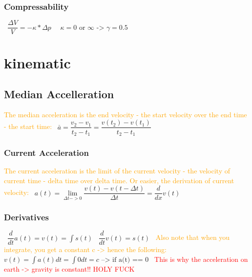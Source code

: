 \documentclass[main.tex,fontsize=8pt,paper=a4,paper=portrait,DIV=calc,]{scrartcl}
\begin{document}
\begin{multicols*}{2}
\subsubsection{Compressability}
\, \newline
\large \( \dfrac{\Delta V}{V} = - \kappa * \Delta p  \)
\, \newline
\, \newline
\large \( \kappa = 0 \text{ or } \infty \text{ -> } \gamma = 0.5  \)
\, \newline
\normalsize 

\section{kinematic}
\subsection{Median Accelleration}
\textcolor{orange}{The median acceleration is the end velocity - the start velocity over the end time - the start time:}\newline
\, \newline
\large \( \overset{\_}{a} = \dfrac{v_2 - v_1}{t_2 - t_1} = \dfrac{v(t_2) - v(t_1)}{t_2 - t_1} \) \newline
\normalsize 

\subsubsection{Current Acceleration}
\textcolor{orange}{The current acceleration is the limit of the current velocity - the velocity of current time - delta time over delta time. \newline
Or easier, the derivation of current velocity:}\newline
\, \newline
\large \( a(t) = \underset{\Delta t -> 0}{\lim} \dfrac{v(t) - v(t - \Delta t)}{\Delta t} = \dfrac{d}{dx}v(t)\) \newline
\normalsize

\subsubsection{Derivatives}
\, \newline
\large \(\dfrac{d}{dt}a(t) = v(t) = \int{s(t)} \)\newline
\, \newline
\large \(\dfrac{d}{dt}v(t) = s(t)\)\newline
\, \newline
\normalsize \textcolor{orange}{Also note that when you integrate, you get a constant c -> hence the following:}\newline
\, \newline
\large \( v(t) = \int{a(t) dt} = \int{0 dt} = c \text{ --> if a(t) == 0}\) \newline
\, \newline
\normalsize \textcolor{red}{This is why the acceleration on earth -> gravity is constant!! HOLY FUCK}


\end{multicols*}
\end{document}
